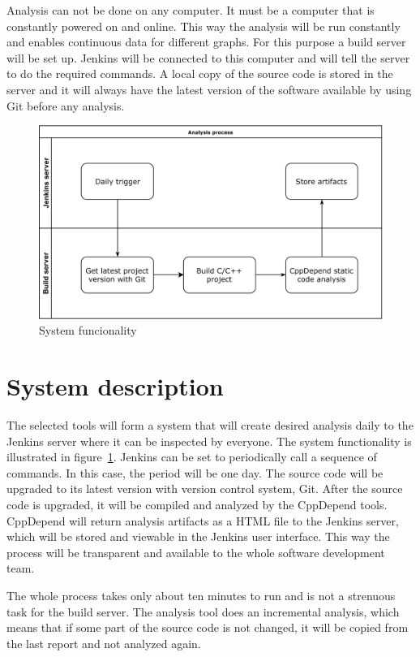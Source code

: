 Analysis can not be done on any computer. It must be a computer that is constantly powered on and online. This way the analysis will be run constantly and enables continuous data for different graphs. For this purpose a build server will be set up. Jenkins will be connected to this computer and will tell the server to do the required commands. A local copy of the source code is stored in the server and it will always have the latest version of the software available by using Git before any analysis.

\begin{figure}[t!]
\centering
\includegraphics[scale=0.06]{systemdesc.png}
\caption{System funcionality}
\label{fig:systemdesc}
\end{figure}

\section{System description}

The selected tools will form a system that will create desired analysis daily to the Jenkins server where it can be inspected by everyone. The system functionality is illustrated in figure~\ref{fig:systemdesc}. Jenkins can be set to periodically call a sequence of commands. In this case, the period will be one day. The source code will be upgraded to its latest version with version control system, Git. After the source code is upgraded, it will be compiled and analyzed by the CppDepend tools. CppDepend will return analysis artifacts as a HTML file to the Jenkins server, which will be stored and viewable in the Jenkins user interface.
This way the process will be transparent and available to the whole software development team.

The whole process takes only about ten minutes to run and is not a strenuous task for the build server. The analysis tool does an incremental analysis, which means that if some part of the source code is not changed, it will be copied from the last report and not analyzed again.

